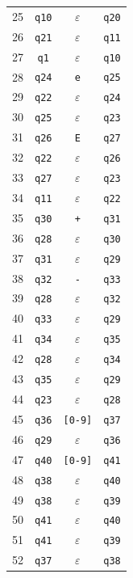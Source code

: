 \documentclass[12pt,a4paper,oneside]{report}
\begin{document}
\begin{longtable}{|r|c|c|c|}
25 & \texttt{q10} & $\varepsilon$ & \texttt{q20} \\
26 & \texttt{q21} & $\varepsilon$ & \texttt{q11} \\
27 & \texttt{q1} & $\varepsilon$ & \texttt{q10} \\
28 & \texttt{q24} & \texttt{e} & \texttt{q25} \\
29 & \texttt{q22} & $\varepsilon$ & \texttt{q24} \\
30 & \texttt{q25} & $\varepsilon$ & \texttt{q23} \\
31 & \texttt{q26} & \texttt{E} & \texttt{q27} \\
32 & \texttt{q22} & $\varepsilon$ & \texttt{q26} \\
33 & \texttt{q27} & $\varepsilon$ & \texttt{q23} \\
34 & \texttt{q11} & $\varepsilon$ & \texttt{q22} \\
35 & \texttt{q30} & \texttt{+} & \texttt{q31} \\
36 & \texttt{q28} & $\varepsilon$ & \texttt{q30} \\
37 & \texttt{q31} & $\varepsilon$ & \texttt{q29} \\
38 & \texttt{q32} & \texttt{-} & \texttt{q33} \\
39 & \texttt{q28} & $\varepsilon$ & \texttt{q32} \\
40 & \texttt{q33} & $\varepsilon$ & \texttt{q29} \\
41 & \texttt{q34} & $\varepsilon$ & \texttt{q35} \\
42 & \texttt{q28} & $\varepsilon$ & \texttt{q34} \\
43 & \texttt{q35} & $\varepsilon$ & \texttt{q29} \\
44 & \texttt{q23} & $\varepsilon$ & \texttt{q28} \\
45 & \texttt{q36} & \texttt{[0-9]} & \texttt{q37} \\
46 & \texttt{q29} & $\varepsilon$ & \texttt{q36} \\
47 & \texttt{q40} & \texttt{[0-9]} & \texttt{q41} \\
48 & \texttt{q38} & $\varepsilon$ & \texttt{q40} \\
49 & \texttt{q38} & $\varepsilon$ & \texttt{q39} \\
50 & \texttt{q41} & $\varepsilon$ & \texttt{q40} \\
51 & \texttt{q41} & $\varepsilon$ & \texttt{q39} \\
52 & \texttt{q37} & $\varepsilon$ & \texttt{q38} \\
\bottomrule
\end{longtable}
\end{document}
